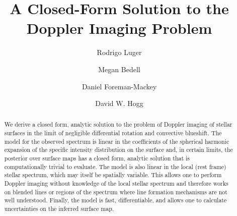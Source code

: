 \documentclass[modern]{aastex62}
\begin{document}
\title{A Closed-Form Solution to the Doppler Imaging Problem}

\author[0000-0002-0296-3826]{Rodrigo Luger}
%
\author{Megan Bedell}
%
\author{Daniel Foreman-Mackey}
%
\author{David W. Hogg}

\begin{abstract}
    We derive a closed form, analytic solution to the problem of Doppler imaging
    of stellar surfaces in the limit of negligible differential rotation and
    convective blueshift. The model for the observed spectrum is linear in the
    coefficients of the spherical harmonic expansion of the specific intensity
    distribution on the surface and, in certain limits, the posterior over surface maps
    has a closed form, analytic solution that is computationally trivial to
    evaluate. The model is also linear in the local (rest frame) stellar spectrum,
    which may itself be spatially variable. This allows one to perform Doppler
    imaging without knowledge of the local stellar spectrum and therefore works
    on blended lines or regions of the spectrum where line formation mechanisms
    are not well understood. Finally, the model is fast, differentiable, and allows
    one to calculate uncertainties on the inferred surface map.
    \href{https://github.com/rodluger/paparazzi}{\color{linkcolor}\faGithub}
\end{abstract}

%
\end{document}
